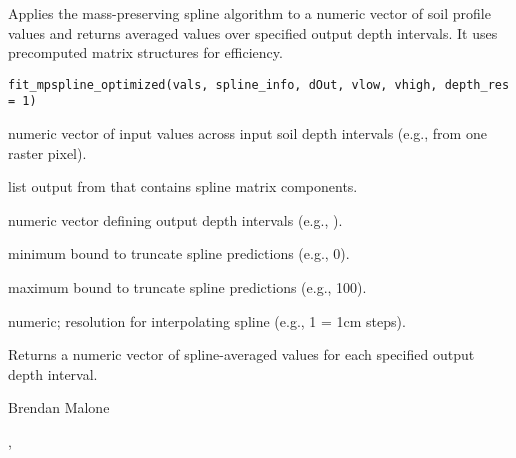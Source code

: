 \documentclass[a4paper]{book}
\begin{document}
%
\begin{Description}
Applies the mass-preserving spline algorithm to a numeric vector of soil profile values and returns averaged values over specified output depth intervals. 
It uses precomputed matrix structures for efficiency.
\end{Description}
%
\begin{Usage}
\begin{verbatim}
fit_mpspline_optimized(vals, spline_info, dOut, vlow, vhigh, depth_res = 1)
\end{verbatim}
\end{Usage}
%
\begin{Arguments}
\begin{ldescription}
\item[\code{vals}] numeric vector of input values across input soil depth intervals (e.g., from one raster pixel).
\item[\code{spline\_info}] list output from  that contains spline matrix components.
\item[\code{dOut}] numeric vector defining output depth intervals (e.g., ).
\item[\code{vlow}] minimum bound to truncate spline predictions (e.g., 0).
\item[\code{vhigh}] maximum bound to truncate spline predictions (e.g., 100).
\item[\code{depth\_res}] numeric; resolution for interpolating spline (e.g., 1 = 1cm steps).
\end{ldescription}
\end{Arguments}
%
\begin{Value}
Returns a numeric vector of spline-averaged values for each specified output depth interval.
\end{Value}
%
\begin{Author}
Brendan Malone
\end{Author}
%
\begin{SeeAlso}
, 
\end{SeeAlso}
%
\end{document}
